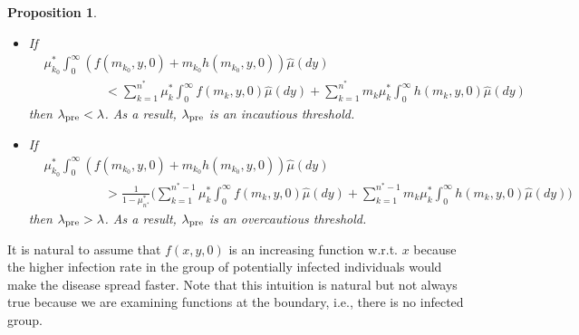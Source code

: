 \documentclass[12pt]{amsart}
\newtheorem{prop}{Proposition}[section]
\theoremstyle{remark}
\numberwithin{equation}{section}
\numberwithin{equation}{section}
\newcommand{\1}{\boldsymbol{1}}
\def\hat{\widehat}
\begin{document}

\begin{prop}\label{thm-51}
	\begin{itemize}
		\item [\rm{(i)}]
	If
	$$
	\begin{aligned}
	&\mu_{k_0}^*\int_0^\infty (f(m_{k_0},y,0)+m_{k_0}h(m_{k_0},y,0))\hat\mu(dy)\\
	&\hspace{2cm}<\sum_{k=1}^{n^*}\mu^*_k\int_0^\infty f(m_k,y,0)\hat\mu(dy)+\sum_{k=1}^{n^*} m_k\mu^*_k\int_0^\infty h(m_k,y,0)\hat\mu(dy)%
	\end{aligned}
	$$
	then $\lambda_{{\rm\tiny pre}}<\lambda$. As a result, $\lambda_{{\rm\tiny pre}}$ is an incautious threshold.
	\item [\rm{(ii)}]	If
	$$
	\begin{aligned}
	&\mu^*_{k_0}\int_0^\infty (f(m_{k_0},y,0)+m_{k_0}h(m_{k_0},y,0))\hat\mu(dy)\\
	&\hspace{2cm}>\frac 1{1-\mu_{n^*}^*}\Big(\sum_{k=1}^{n^*-1}\mu^*_k\int_0^\infty f(m_k,y,0)\hat\mu(dy)+\sum_{k=1}^{n^*-1} m_k\mu^*_k\int_0^\infty h(m_k,y,0)\hat\mu(dy) \Big)
	\end{aligned}
	$$
	then $\lambda_{{\rm\tiny pre}}>\lambda$. As a result, $\lambda_{{\rm\tiny pre}}$ is an overcautious threshold.
		\end{itemize}

\end{prop}


	It is natural to assume that $f(x,y,0)$ is an increasing function w.r.t. $x$ because the higher infection rate in the group of potentially infected individuals would make the disease spread faster.
	Note that this intuition is natural but not
always true because we are examining
functions at the boundary, i.e., there is no infected group.
\end{document}
